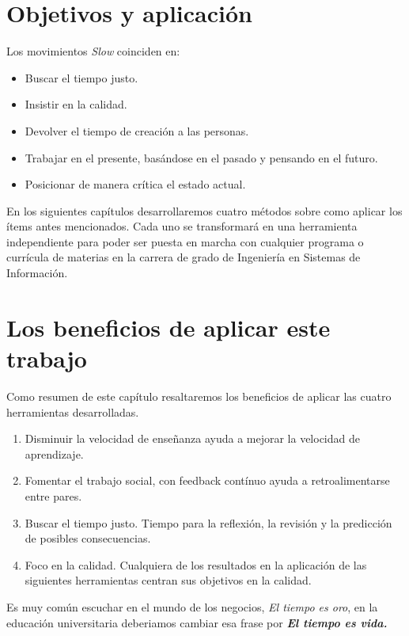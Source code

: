 \section{Objetivos y aplicaci\'on}
Los movimientos \textit{Slow} coinciden en:
\begin{itemize}
 \item Buscar el tiempo justo.
 \item Insistir en la calidad.
 \item Devolver el tiempo de creaci\'on a las personas.
 \item Trabajar en el presente, bas\'andose en el pasado y pensando en el futuro.
 \item Posicionar de manera cr\'itica el estado actual.
\end{itemize}
En los siguientes cap\'itulos desarrollaremos cuatro m\'etodos sobre como aplicar los \'items antes mencionados. Cada uno se transformar\'a en una herramienta 
independiente para poder ser puesta en marcha con cualquier programa o curr\'icula de materias en la carrera de grado de Ingenier\'ia en Sistemas de 
Informaci\'on.\\


\section{Los beneficios de aplicar este trabajo}
Como resumen de este cap\'itulo resaltaremos los beneficios de aplicar las cuatro herramientas desarrolladas.
\begin{enumerate}
 \item Disminuir la velocidad de ense\~nanza ayuda a mejorar la velocidad de aprendizaje.
 \item Fomentar el trabajo social, con feedback cont\'inuo ayuda a retroalimentarse entre pares.
 \item Buscar el tiempo justo. Tiempo para la reflexi\'on, la revisi\'on y la predicci\'on de posibles consecuencias.
 \item Foco en la calidad. Cualquiera de los resultados en la aplicaci\'on de las siguientes herramientas centran sus objetivos en la calidad.
\end{enumerate}
Es muy com\'un escuchar en el mundo de los negocios, \textit{El tiempo es oro}, en la educaci\'on universitaria deberiamos cambiar esa frase por 
\textit{\textbf{El tiempo es vida.}}





